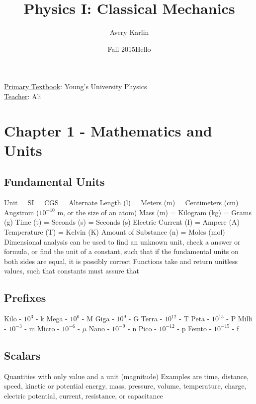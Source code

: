 \documentclass[11 pt, twoside]{article}
\newenvironment{outline*}
{
	\begin{outline}[enumerate]
	}
	{\end{outline}
}
\begin{document}
\title{Physics I: Classical Mechanics}
\author{Avery Karlin}
\date{Fall 2015Hello}
\newcommand{\textbook}{Young's University Physics}
\newcommand{\teacher}{Ali}

\maketitle
\newpage
\hypertarget{content}{\tableofcontents}
\vspace{11pt}
\noindent
\underline{Primary Textbook}: \textbook\\
\underline{Teacher}: \teacher
\newpage

\section{Chapter 1 - Mathematics and Units}
\subsection{Fundamental Units}
\begin{outline*}
\1 Unit = SI = CGS = Alternate
\1 Length (l) = Meters (m) = Centimeters (cm) = Angstrom ($10^{-10}$ m, or the size of an atom)
\1 Mass (m) = Kilogram (kg) = Grams (g)
\1 Time (t) = Seconds (s) = Seconds (s)
\1 Electric Current (I) = Ampere (A)
\1 Temperature (T) = Kelvin (K)
\1 Amount of Substance (n) = Moles (mol)
\1 Dimensional analysis can be used to find an unknown unit, check a answer or formula, or find the unit of a constant, such that if the fundamental units on both sides are equal, it is possibly correct
\2 Functions take and return unitless values, such that constants must assure that
\end{outline*}
\subsection{Prefixes}
\begin{outline*}
\1 Kilo - $10^3$ - k
\1 Mega - $10^6$ - M
\1 Giga - $10^9$ - G
\1 Terra - $10^{12}$ - T
\1 Peta - $10^{15}$ - P
\1 Milli - $10^{-3}$ - m
\1 Micro - $10^{-6}$ - $\mu$
\1 Nano - $10^{-9}$ - n
\1 Pico - $10^{-12}$ - p
\1 Femto - $10^{-15}$ - f
\end{outline*}
\subsection{Scalars}
\begin{outline*}
\1 Quantities with only value and a unit (magnitude)
\1 Examples are time, distance, speed, kinetic or potential energy, mass, pressure, volume, temperature, charge, electric potential, current, resistance, or capacitance
\end{outline*}
\end{document}
